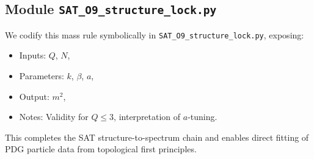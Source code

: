 \subsection*{Module \texttt{SAT\_O9\_structure\_lock.py}}

We codify this mass rule symbolically in \texttt{SAT\_O9\_structure\_lock.py}, exposing:
\begin{itemize}
    \item Inputs: $Q$, $N$,
    \item Parameters: $k$, $\beta$, $a$,
    \item Output: $m^2$,
    \item Notes: Validity for $Q \leq 3$, interpretation of $a$-tuning.
\end{itemize}

This completes the SAT structure-to-spectrum chain and enables direct fitting of PDG particle data from topological first principles.
